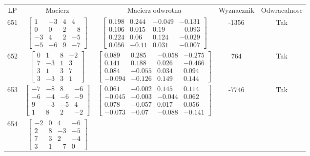 \documentclass[a4paper,12pt]{article}
\begin{document}
\bgroup {} \vspace{0.2in} \begin{tabular}{c c c c c}
LP & Macierz & Macierz odwrotna & Wyznacznik & Odwracalnosc\\
651
&
$\begin{bmatrix} 1 & -3 & 4 & 4 \\ 0 & 0 & 2 & -8 \\ -3 & 4 & 2 & -5 \\ -5 & -6 & 9 & -7 \end{bmatrix}$
&
$\begin{bmatrix} 0.198 & 0.244 & -0.049 & -0.131 \\ 0.106 & 0.015 & 0.19 & -0.093 \\ 0.224 & 0.06 & 0.124 & -0.029 \\ 0.056 & -0.11 & 0.031 & -0.007 \end{bmatrix}$
&
-1356
&
Tak
\\
652
&
$\begin{bmatrix} 0 & 1 & 8 & -2 \\ 7 & -3 & 1 & 3 \\ 3 & 1 & 3 & 7 \\ 3 & -3 & 3 & 1 \end{bmatrix}$
&
$\begin{bmatrix} 0.089 & 0.285 & -0.058 & -0.275 \\ 0.141 & 0.188 & 0.026 & -0.466 \\ 0.084 & -0.055 & 0.034 & 0.094 \\ -0.094 & -0.126 & 0.149 & 0.144 \end{bmatrix}$
&
764
&
Tak
\\
653
&
$\begin{bmatrix} -7 & -8 & 8 & -6 \\ -6 & -4 & -6 & -9 \\ 9 & -3 & -5 & 4 \\ 1 & 8 & 2 & -2 \end{bmatrix}$
&
$\begin{bmatrix} 0.061 & -0.002 & 0.145 & 0.114 \\ -0.045 & -0.003 & -0.044 & 0.062 \\ 0.078 & -0.057 & 0.017 & 0.056 \\ -0.073 & -0.07 & -0.088 & -0.141 \end{bmatrix}$
&
-7746
&
Tak
\\
654
&
$\begin{bmatrix} -2 & 0 & 4 & -6 \\ 2 & 8 & -3 & -5 \\ 7 & 3 & 2 & -4 \\ 3 & 1 & -7 & 0 \end{bmatrix}$

\end{tabular}
\end{document}
